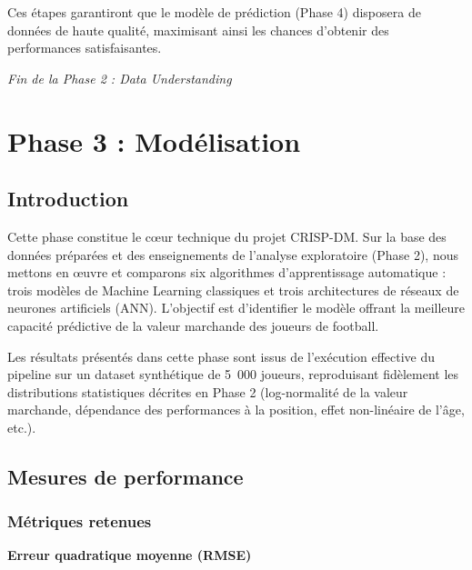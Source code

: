 \documentclass[12pt,a4paper]{article}
\begin{document}
Ces étapes garantiront que le modèle de prédiction (Phase 4) disposera de données de haute qualité, maximisant ainsi les chances d'obtenir des performances satisfaisantes.

\vspace{1cm}

\begin{center}
\textit{Fin de la Phase 2 : Data Understanding}
\end{center}

\newpage
\section{Phase 3 : Modélisation}

\subsection{Introduction}

Cette phase constitue le cœur technique du projet CRISP-DM. Sur la base des données
préparées et des enseignements de l'analyse exploratoire (Phase 2), nous mettons en
œuvre et comparons six algorithmes d'apprentissage automatique : trois modèles de
Machine Learning classiques et trois architectures de réseaux de neurones artificiels
(ANN). L'objectif est d'identifier le modèle offrant la meilleure capacité prédictive
de la valeur marchande des joueurs de football.

Les résultats présentés dans cette phase sont issus de l'exécution effective du
pipeline sur un dataset synthétique de 5~000 joueurs, reproduisant fidèlement les
distributions statistiques décrites en Phase 2 (log-normalité de la valeur marchande,
dépendance des performances à la position, effet non-linéaire de l'âge, etc.).

\subsection{Mesures de performance}

\subsubsection{Métriques retenues}

\textbf{Erreur quadratique moyenne (RMSE)}
\end{document}
